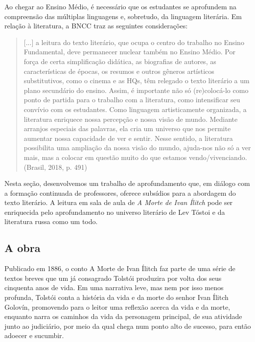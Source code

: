 \documentclass[12pt]{extarticle}
\begin{document}
Ao chegar ao Ensino Médio, é necessário que os estudantes se aprofundem
na compreensão das múltiplas linguagens e, sobretudo, da linguagem
literária. Em relação à literatura, a BNCC traz as seguintes
considerações:

\begin{quote}
{[}...{]} a leitura do texto literário, que ocupa o centro do trabalho
no Ensino Fundamental, deve permanecer nuclear também no Ensino Médio.
Por força de certa simplificação didática, as biografias de autores, as
características de épocas, os resumos e outros gêneros artísticos
substitutivos, como o cinema e as HQs, têm relegado o texto literário a
um plano secundário do ensino. Assim, é importante não só (re)colocá-lo
como ponto de partida para o trabalho com a literatura, como
intensificar seu convívio com os estudantes. Como linguagem
artisticamente organizada, a literatura enriquece nossa percepção e
nossa visão de mundo. Mediante arranjos especiais das palavras, ela cria
um universo que nos permite aumentar nossa capacidade de ver e sentir.
Nesse sentido, a literatura possibilita uma ampliação da nossa visão do
mundo, ajuda-nos não só a ver mais, mas a colocar em questão muito do
que estamos vendo/vivenciando. (Brasil, 2018, p. 491)
\end{quote}

Nesta seção, desenvolvemos um trabalho de aprofundamento que, em diálogo
com a formação continuada de professores, oferece subsídios para a
abordagem do texto literário. A leitura em sala de aula de \emph{A Morte
de Ivan Ílitch} pode ser enriquecida pelo aprofundamento no universo
literário de Lev Tóstoi e da literatura russa como um todo.




\subsection{A obra}

Publicado em 1886, o conto A Morte de Ivan Ílitch faz parte de uma série
de textos breves que um já consagrado Tolstói produzira por volta dos
seus cinquenta anos de vida. Em uma narrativa leve, mas nem por isso
menos profunda, Tolstói conta a história da vida e da morte do senhor
Ivan Ílitch Golovín, promovendo para o leitor uma reflexão acerca da
vida e da morte, enquanto narra os caminhos da vida da personagem
principal, de sua atividade junto ao judiciário, por meio da qual chega
num ponto alto de sucesso, para então adoecer e sucumbir.
\end{document}
